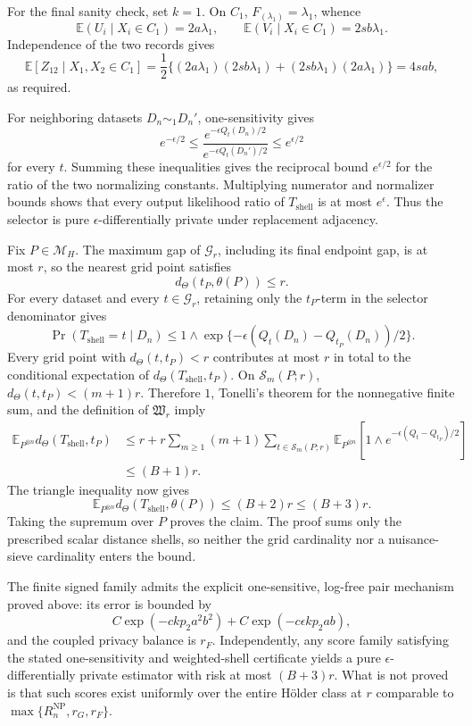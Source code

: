 For the final sanity check, set \(k=1\).  On \(C_1\), \(F_{(\lambda_1)}=\lambda_1\), whence
\[
 \mathbb E(U_i\mid X_i\in C_1)=2a\lambda_1,
 \qquad
 \mathbb E(V_i\mid X_i\in C_1)=2sb\lambda_1.
\]
Independence of the two records gives
\[
 \mathbb E\!\left[Z_{12}\mid X_1,X_2\in C_1\right]
 =\frac12\{(2a\lambda_1)(2sb\lambda_1)
 +(2sb\lambda_1)(2a\lambda_1)\}=4sab,
\]
as required.

For neighboring datasets \(D_n\sim_1D_n'\), one-sensitivity gives
\[
 e^{-\epsilon/2}
 \le\frac{e^{-\epsilon Q_t(D_n)/2}}{e^{-\epsilon Q_t(D_n')/2}}
 \le e^{\epsilon/2}
\]
for every \(t\).  Summing these inequalities gives the reciprocal bound \(e^{\epsilon/2}\) for the ratio of the two normalizing constants.  Multiplying numerator and normalizer bounds shows that every output likelihood ratio of \(T_{\mathrm{shell}}\) is at most \(e^\epsilon\).  Thus the selector is pure \(\epsilon\)-differentially private under replacement adjacency.

Fix \(P\in\mathcal M_H\).  The maximum gap of \(\mathcal G_r\), including its final endpoint gap, is at most \(r\), so the nearest grid point satisfies
\[
 d_\Theta(t_P,\theta(P))\le r.
\]
For every dataset and every \(t\in\mathcal G_r\), retaining only the \(t_P\)-term in the selector denominator gives
\[
 \Pr(T_{\mathrm{shell}}=t\mid D_n)
 \le 1\wedge
 \exp\{-\epsilon(Q_t(D_n)-Q_{t_P}(D_n))/2\}. \tag{1}
\]
Every grid point with \(d_\Theta(t,t_P)<r\) contributes at most \(r\) in total to the conditional expectation of \(d_\Theta(T_{\mathrm{shell}},t_P)\).  On \(\mathcal S_m(P;r)\), \(d_\Theta(t,t_P)<(m+1)r\).  Therefore \(1\), Tonelli's theorem for the nonnegative finite sum, and the definition of \(\mathfrak W_r\) imply
\[
 \begin{aligned}
 \mathbb E_{P^{\otimes n}}d_\Theta(T_{\mathrm{shell}},t_P)
 &\le r+r\sum_{m\ge1}(m+1)
 \sum_{t\in\mathcal S_m(P;r)}
 \mathbb E_{P^{\otimes n}}
 \left[1\wedge e^{-\epsilon(Q_t-Q_{t_P})/2}\right]\\
 &\le (B+1)r.
 \end{aligned}
\]
The triangle inequality now gives
\[
 \mathbb E_{P^{\otimes n}}d_\Theta(T_{\mathrm{shell}},\theta(P))
 \le(B+2)r\le(B+3)r.
\]
Taking the supremum over \(P\) proves the claim.  The proof sums only the prescribed scalar distance shells, so neither the grid cardinality nor a nuisance-sieve cardinality enters the bound.

The finite signed family admits the explicit one-sensitive, log-free pair mechanism proved above: its error is bounded by
\[
 C\exp(-ckp_2a^2b^2)+C\exp(-c\epsilon kp_2ab),
\]
and the coupled privacy balance is \(r_F\).  Independently, any score family satisfying the stated one-sensitivity and weighted-shell certificate yields a pure \(\epsilon\)-differentially private estimator with risk at most \((B+3)r\).  What is not proved is that such scores exist uniformly over the entire Hölder class at \(r\) comparable to \(\max\{R_n^{\mathrm{NP}},r_G,r_F\}\).
